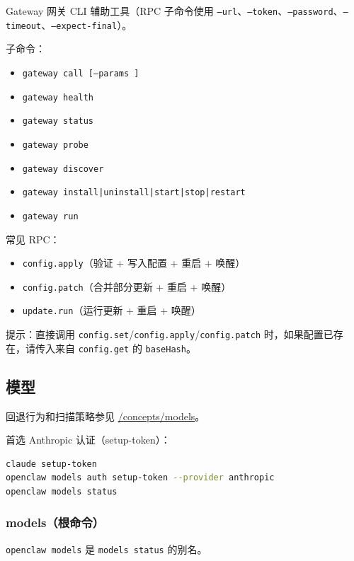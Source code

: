 Gateway 网关 CLI 辅助工具（RPC 子命令使用 \texttt{--url}、\texttt{--token}、\texttt{--password}、\texttt{--timeout}、\texttt{--expect-final}）。

子命令：

\begin{itemize}
  \item \texttt{gateway call  [--params ]}
  \item \texttt{gateway health}
  \item \texttt{gateway status}
  \item \texttt{gateway probe}
  \item \texttt{gateway discover}
  \item \texttt{gateway install|uninstall|start|stop|restart}
  \item \texttt{gateway run}
\end{itemize}


常见 RPC：

\begin{itemize}
  \item \texttt{config.apply}（验证 + 写入配置 + 重启 + 唤醒）
  \item \texttt{config.patch}（合并部分更新 + 重启 + 唤醒）
  \item \texttt{update.run}（运行更新 + 重启 + 唤醒）
\end{itemize}


提示：直接调用 \texttt{config.set}/\texttt{config.apply}/\texttt{config.patch} 时，如果配置已存在，请传入来自 \texttt{config.get} 的 \texttt{baseHash}。

\subsection{模型}


回退行为和扫描策略参见 \href{/concepts/models}{/concepts/models}。

首选 Anthropic 认证（setup-token）：

\begin{lstlisting}[language=bash]
claude setup-token
openclaw models auth setup-token --provider anthropic
openclaw models status
\end{lstlisting}


\subsubsection{models（根命令）}


\texttt{openclaw models} 是 \texttt{models status} 的别名。

